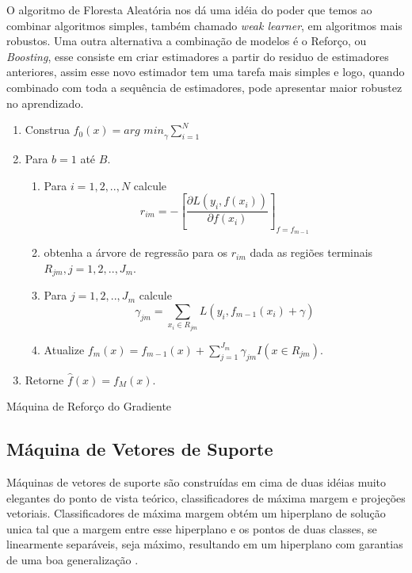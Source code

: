 O algoritmo de Floresta Aleatória nos dá uma idéia do poder que temos ao
combinar algoritmos simples, também chamado \textit{weak learner}, em
algoritmos mais robustos. Uma outra alternativa a combinação de modelos é o
Reforço, ou \textit{Boosting}, esse consiste em criar estimadores a partir do
residuo de estimadores anteriores, assim esse novo estimador tem uma tarefa
mais simples e logo, quando combinado com toda a sequência de estimadores, pode
apresentar maior robustez no aprendizado.

\begin{algorithm}[H]
    \begin{enumerate}
        \item Construa $f_0(x) = \textit{arg min}_\gamma \sum_{i=1}^N$
        \item Para $b=1$ até $B$.
        \begin{enumerate}
            \item Para $i=1,2,..,N$ calcule
                \[ r_{im} = - \left[ \frac{\partial L(y_i,f(x_i))}{\partial
                f(x_i)} \right]_{f=f_{m-1}}\]
            \item obtenha a árvore de regressão para os $r_{im}$ dada as
                regiões terminais $R_{jm}, j=1,2,..,J_m$.
            \item Para $j=1,2,..,J_m$ calcule
                \[\gamma_{jm} = \sum_{x_i \in R_{jm}}
                L(y_i,f_{m-1}(x_i)+\gamma)\]
            \item Atualize $f_m(x) = f_{m-1}(x) +
                \sum_{j=1}^{J_m} \gamma_{jm}I(x \in R_{jm})$.
        \end{enumerate}
        \item Retorne $\hat{f}(x) = f_M(x)$.
    \end{enumerate}
    \caption{Máquina de Reforço do Gradiente}
    \label{algo:gbm}
\end{algorithm}


\subsection{Máquina de Vetores de Suporte}
Máquinas de vetores de suporte são construídas em cima de duas idéias muito
elegantes do ponto de vista teórico, classificadores de máxima margem e
projeções vetoriais. Classificadores de máxima margem obtém um hiperplano de
solução unica tal que a margem entre esse hiperplano e os pontos de duas
classes, se linearmente separáveis, seja máximo, resultando em um hiperplano
com garantias de uma boa generalização \cite{vapnik2013nature}.

